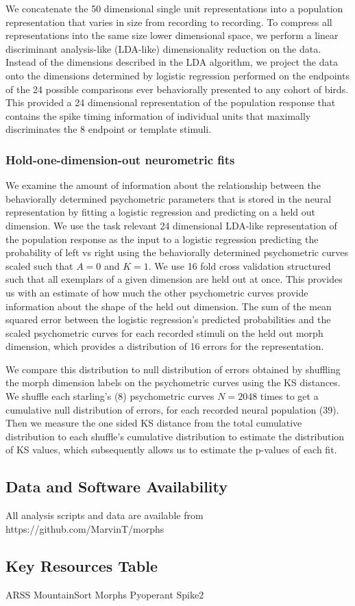 We concatenate the 50 dimensional single unit representations into a population representation that varies in size from recording to recording. To compress all representations into the same size lower dimensional space, we perform a linear discriminant analysis-like (LDA-like) dimensionality reduction on the data. Instead of the dimensions described in the LDA algorithm, we project the data onto the dimensions determined by logistic regression performed on the endpoints of the 24 possible comparisons ever behaviorally presented to any cohort of birds. This provided a 24 dimensional representation of the population response that contains the spike timing information of individual units that maximally discriminates the 8 endpoint or template stimuli.

\subsubsection{Hold-one-dimension-out neurometric fits}

We examine the amount of information about the relationship between the behaviorally determined psychometric parameters that is stored in the neural representation by fitting a logistic regression and predicting on a held out dimension. We use the task relevant 24 dimensional LDA-like representation of the population response as the input to a logistic regression predicting the probability of left vs right using the behaviorally determined psychometric curves scaled such that $A=0$ and $K=1$. We use 16 fold cross validation structured such that all exemplars of a given dimension are held out at once. This provides us with an estimate of how much the other psychometric curves provide information about the shape of the held out dimension. The sum of the mean squared error between the logistic regression's predicted probabilities and the scaled psychometric curves for each recorded stimuli on the held out morph dimension, which provides a distribution of 16 errors for the representation.

We compare this distribution to null distribution of errors obtained by shuffling the morph dimension labels on the psychometric curves using the \ac{KS} distances. We shuffle each starling's (8) psychometric curves $N=2048$ times to get a cumulative null distribution of errors, for each recorded neural population (39). Then we measure the one sided KS distance from the total cumulative distribution to each shuffle's cumulative distribution to estimate the distribution of KS values, which subsequently allows us to estimate the p-values of each fit.

\subsection{Data and Software Availability}
All analysis scripts and data are available from https://github.com/MarvinT/morphs

\subsection{Key Resources Table}
ARSS
MountainSort
Morphs
Pyoperant
Spike2